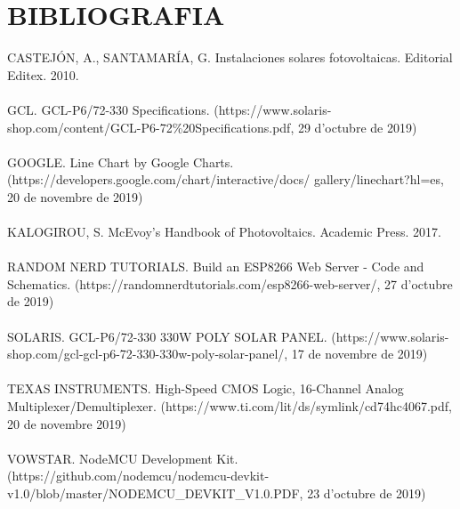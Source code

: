 \chapter{\uppercase{Bibliografia}}
CASTEJÓN, A., SANTAMARÍA, G. Instalaciones solares fotovoltaicas. Editorial Editex. 2010. \\ \\
GCL. GCL-P6/72-330 Specifications. (https://www.solaris-shop.com/content/GCL-P6-72\%20Specifications.pdf, 29 d'octubre de 2019) \\ \\
GOOGLE. Line Chart by Google Charts. (https://developers.google.com/chart/interactive/docs/
gallery/linechart?hl=es, 20 de novembre de 2019) \\ \\
KALOGIROU, S. McEvoy's Handbook of Photovoltaics. Academic Press. 2017. \\ \\
RANDOM NERD TUTORIALS. Build an ESP8266 Web Server - Code and Schematics. (https://randomnerdtutorials.com/esp8266-web-server/, 27 d'octubre de 2019) \\ \\
SOLARIS. GCL-P6/72-330 330W POLY SOLAR PANEL. (https://www.solaris-shop.com/gcl-gcl-p6-72-330-330w-poly-solar-panel/, 17 de novembre de 2019) \\ \\
TEXAS INSTRUMENTS. High-Speed CMOS Logic, 16-Channel Analog Multiplexer/Demultiplexer. (https://www.ti.com/lit/ds/symlink/cd74hc4067.pdf, 20 de novembre 2019) \\ \\
VOWSTAR. NodeMCU Development Kit. (https://github.com/nodemcu/nodemcu-devkit-v1.0/blob/master/NODEMCU\_DEVKIT\_V1.0.PDF, 23 d'octubre de 2019)



